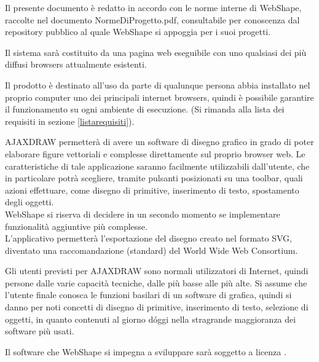 
Il presente documento \`e redatto in accordo con le norme interne di WebShape, raccolte nel documento NormeDiProgetto.pdf, consultabile per conoscenza dal repository pubblico al quale WebShape si appoggia per i suoi progetti.



Il sistema sar\`a costituito da una pagina web eseguibile con uno qualsiasi dei pi\`u diffusi browsers attualmente esistenti.

Il prodotto \`e destinato all'uso da parte di qualunque persona abbia installato nel proprio computer uno dei principali internet browsers, quindi \`e possibile garantire il funzionamento su ogni ambiente di esecuzione. (Si rimanda alla lista dei requisiti in sezione \ref{listarequisiti}).

AJAXDRAW permetter\`a di avere un software di disegno grafico in grado di poter elaborare figure vettoriali e complesse direttamente sul proprio browser web. Le caratteristiche di tale applicazione saranno facilmente utilizzabili dall'utente, che in particolare potr\`a scegliere, tramite pulsanti posizionati su una toolbar, quali azioni effettuare, come disegno di primitive, inserimento di testo, spostamento degli oggetti.\\
WebShape si riserva di decidere in un secondo momento se implementare funzionalit\`a aggiuntive pi\`u complesse.\\
L'applicativo permetter\`a l'esportazione del disegno creato nel formato SVG, diventato una raccomandazione (standard) del World Wide Web Consortium.

\label{definizione_utente}
Gli utenti previsti per AJAXDRAW sono normali utilizzatori di Internet, quindi persone dalle varie capacit\`a tecniche, dalle pi\`u basse alle pi\`u alte. Si assume che l'utente finale conosca le funzioni basilari di un software di grafica, quindi si danno per noti concetti di disegno di primitive, inserimento di testo, selezione di oggetti, in quanto contenuti al giorno d\'oggi nella stragrande maggioranza dei software pi\`u usati.

Il software che WebShape si impegna a sviluppare sar\`a soggetto a licenza .

